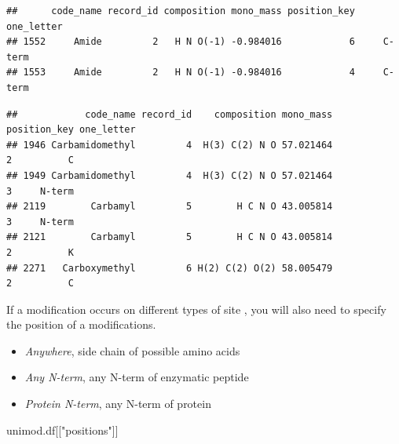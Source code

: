 \documentclass[
]{article}
\newenvironment{Shaded}{\begin{snugshade}}{\end{snugshade}}
\newcommand{\DecValTok}[1]{\textcolor[rgb]{0.00,0.00,0.81}{#1}}
\newcommand{\FunctionTok}[1]{\textcolor[rgb]{0.00,0.00,0.00}{#1}}
\newcommand{\NormalTok}[1]{#1}
\newcommand{\SpecialCharTok}[1]{\textcolor[rgb]{0.00,0.00,0.00}{#1}}
\newcommand{\StringTok}[1]{\textcolor[rgb]{0.31,0.60,0.02}{#1}}
\providecommand{\tightlist}{%
  \setlength{\itemsep}{0pt}\setlength{\parskip}{0pt}}
\begin{document}
\begin{verbatim}
##      code_name record_id composition mono_mass position_key one_letter
## 1552     Amide         2   H N O(-1) -0.984016            6     C-term
## 1553     Amide         2   H N O(-1) -0.984016            4     C-term
\end{verbatim}

\begin{Shaded}
\end{Shaded}

\begin{verbatim}
##            code_name record_id    composition mono_mass position_key one_letter
## 1946 Carbamidomethyl         4  H(3) C(2) N O 57.021464            2          C
## 1949 Carbamidomethyl         4  H(3) C(2) N O 57.021464            3     N-term
## 2119        Carbamyl         5        H C N O 43.005814            3     N-term
## 2121        Carbamyl         5        H C N O 43.005814            2          K
## 2271   Carboxymethyl         6 H(2) C(2) O(2) 58.005479            2          C
\end{verbatim}

If a modification occurs on different types of site , you will also need
to specify the position of a modifications.

\begin{itemize}
\tightlist
\item
  \emph{Anywhere}, side chain of possible amino acids
\item
  \emph{Any N-term}, any N-term of enzymatic peptide
\item
  \emph{Protein N-term}, any N-term of protein
\end{itemize}

\begin{Shaded}
\begin{Highlighting}[]
\NormalTok{unimod.df[[}\StringTok{"positions"}\NormalTok{]]}
\end{Highlighting}
\end{Shaded}
\end{document}

